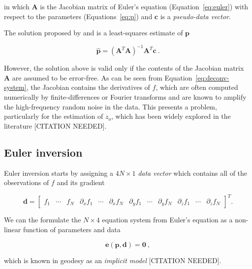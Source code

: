 \noindent
in which $\mathbf{A}$ is the Jacobian matrix of Euler's equation
(Equation~\ref{eq:euler}) with respect to the parameters
(Equations~\ref{eq:p})
and $\mathbf{c}$ is a \textit{pseudo-data vector}.

The solution proposed by \citet{Thompson1982} and \citet{Reid1990} is a
least-squares estimate of $\mathbf{p}$

\begin{equation}
  \hat{\mathbf{p}} = \left(\mathbf{A}^T\mathbf{A}\right)^{-1}
  \mathbf{A}^T\mathbf{c}
  \ .
  \label{eq:deconv-p}
\end{equation}

\noindent
However, the solution above is valid only if the contents of the Jacobian
matrix $\mathbf{A}$ are assumed to be error-free.
As can be seen from Equation~\ref{eq:deconv-system}, the Jacobian contains the
derivatives of $f$, which are often computed numerically by finite-differences
or Fourier transforms and are known to amplify the high-frequency random noise
in the data.
This presents a problem, particularly for the estimation of $z_o$, which has
been widely explored in the literature [CITATION NEEDED].


\subsection{Euler inversion}

Euler inversion starts by assigning a $4N \times 1$ \textit{data vector}
which contains all of the observations of $f$ and its gradient

\begin{equation}
  \mathbf{d} =
  \begin{bmatrix}
    f_1 & \cdots & f_N &
    \partial_x f_1 & \cdots & \partial_x f_N &
    \partial_y f_1 & \cdots & \partial_y f_N &
    \partial_z f_1 & \cdots & \partial_z f_N
  \end{bmatrix}^T.
  \label{eq:d}
\end{equation}

\noindent
We can the formulate the $N \times 4$ equation system from Euler's equation as
a non-linear function of parameters and data

\begin{equation}
  \mathbf{e}(\mathbf{p}, \mathbf{d}) = \mathbf{0}
  \ ,
  \label{eq:e}
\end{equation}

\noindent
which is known in geodesy as an \textit{implicit model} [CITATION NEEDED].

